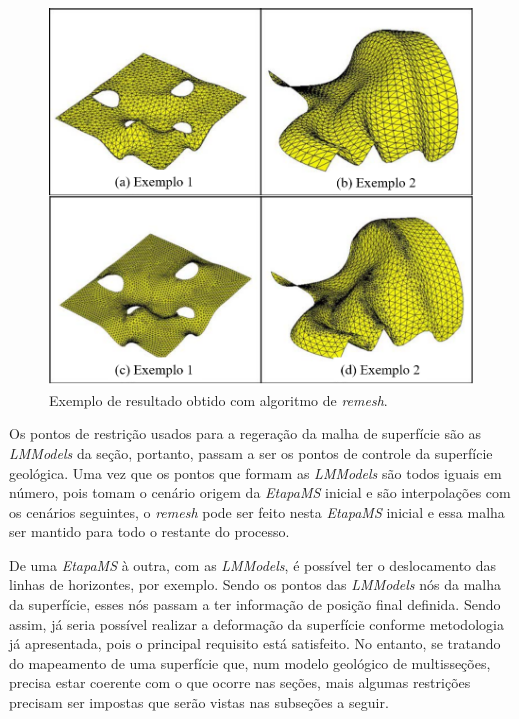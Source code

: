 \begin{figure} [H]
  \begin{center}
    \includegraphics[width=350pt]{images/fig-remesh}
    \caption{Exemplo de resultado obtido com algoritmo de \textit{remesh}\cite{Miranda}.}\label{fig-remesh}
  \end{center}
\end{figure}

Os pontos de restrição usados para a regeração da malha de superfície são as \textit{LMModels} da seção, portanto, passam a ser os pontos de controle da superfície geológica. Uma vez que os pontos que formam as \textit{LMModels} são todos iguais em número, pois tomam o cenário origem da \textit{EtapaMS} inicial e são interpolações com os cenários seguintes, o \textit{remesh} pode ser feito nesta \textit{EtapaMS} inicial e essa malha ser mantido para todo o restante do processo.

De uma \textit{EtapaMS} à outra, com as \textit{LMModels}, é possível ter o deslocamento das linhas de horizontes, por exemplo. Sendo os pontos das \textit{LMModels} nós da malha da superfície, esses nós passam a ter informação de posição final definida. Sendo assim, já seria possível realizar a deformação da superfície conforme metodologia já apresentada, pois o principal requisito está satisfeito. No entanto, se tratando do mapeamento de uma superfície que, num modelo geológico de multisseções, precisa estar coerente com o que ocorre nas seções, mais algumas restrições precisam ser impostas que serão vistas nas subseções a seguir.

